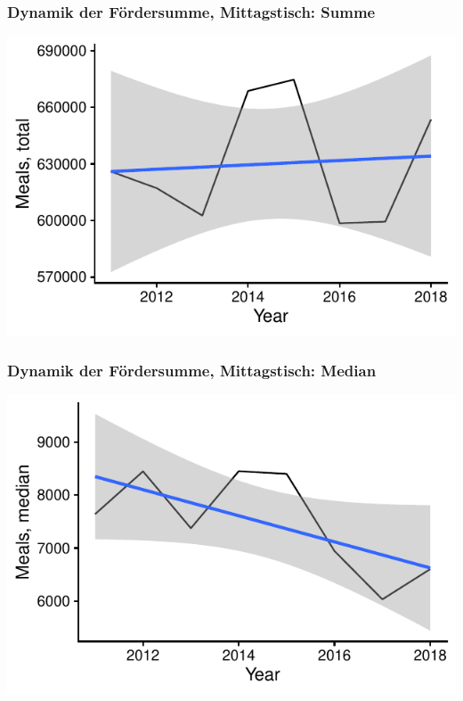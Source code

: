 \begin{frame}[fragile]
\frametitle{Dynamik der Fördersumme, Mittagstisch: Summe}



{\centering \includegraphics[width=\maxwidth]{figure/beamer-FundamentalDynamicsMealsTotal-1} 

}



\end{frame}

\begin{frame}[fragile]
\frametitle{Dynamik der Fördersumme, Mittagstisch: Median}



{\centering \includegraphics[width=\maxwidth]{figure/beamer-FundamentalDynamicsMealsMedian-1} 

}



\end{frame}

